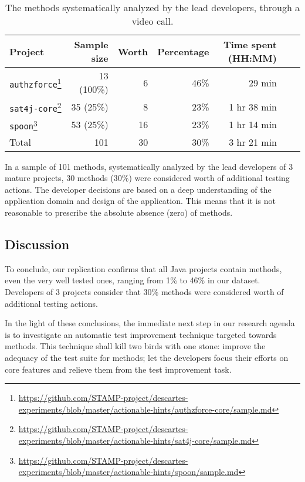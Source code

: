 \begin{table}
	\caption{The \pseudotested{} methods systematically analyzed by the lead developers, through a video call.}
	\label{tab:todevelopers}
	\centering
	\begin{tabular}{lrrrrrr}
		\toprule
		Project             & Sample size & Worth & Percentage  & Time spent (HH:MM)  \\
		\midrule
		\texttt{authzforce}\footnote{\url{https://github.com/STAMP-project/descartes-experiments/blob/master/actionable-hints/authzforce-core/sample.md}} &  13 (100\%) &                    6 &        46\% & 29 min              \\  
		\texttt{sat4j-core}\footnote{\url{https://github.com/STAMP-project/descartes-experiments/blob/master/actionable-hints/sat4j-core/sample.md}} &  35  (25\%) &                    8 &        23\% & 1 hr 38 min         \\
		\texttt{spoon}\footnote{\url{https://github.com/STAMP-project/descartes-experiments/blob/master/actionable-hints/spoon/sample.md}}      &  53  (25\%) &                   16 &        23\% & 1 hr 14 min         \\
		\midrule
		Total               & 101         &                   30 &        30\% & 3 hr 21 min         \\
		\bottomrule
	\end{tabular}
\end{table}

In a sample of 101 \pseudotested{} methods, systematically analyzed by the lead developers of 3 mature projects, 30 methods (30\%) were considered worth of additional testing actions. 
The developer decisions are based on a deep understanding of the application domain and design of the application. 
This means that it is not reasonable to prescribe the absolute absence (zero) of \pseudotested{} methods.

\subsection{Discussion}
\label{subsec:transversal-contributions:descartes:conclusion}

To conclude, our replication confirms that all Java projects contain \pseudotested{} methods, even the very well tested ones, ranging from 1\% to 46\% in our dataset.
Developers of 3 projects consider that 30\% methods were considered worth of additional testing actions.

In the light of these conclusions, the immediate next step in our research agenda is to investigate an automatic test improvement technique targeted towards \pseudotested{} methods.
This technique shall kill two birds with one stone: improve the adequacy of the test suite for \pseudotested{} methods; 
let the developers focus their efforts on core features and relieve them from the test improvement task.

